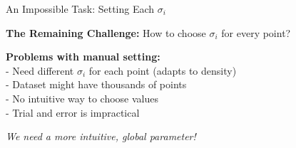 \documentclass{beamer}
\begin{document}
\begin{frame}{An Impossible Task: Setting Each $\sigma_i$}
\vspace{-0.2cm}

\textbf{\color{upcblue}The Remaining Challenge:} How to choose $\sigma_i$ for every point?

\vspace{0.3cm}
\begin{center}
\end{center}

\vspace{0.3cm}
\begin{center}
\colorbox{red!10}{
\begin{minipage}{0.85\textwidth}
\centering
\textbf{Problems with manual setting:}\\
\footnotesize
- Need different $\sigma_i$ for each point (adapts to density)\\
- Dataset might have thousands of points\\
- No intuitive way to choose values\\
- Trial and error is impractical
\end{minipage}
}
\end{center}

\vspace{0.3cm}
\begin{center}
\textit{\color{upcblue}We need a more intuitive, global parameter!}
\end{center}
\end{frame}
\end{document}
